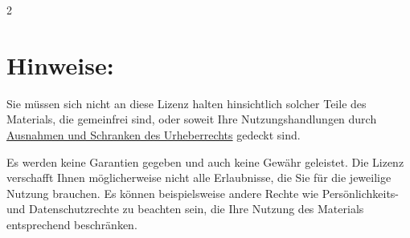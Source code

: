 \begin{multicols}{2}
\section*{Hinweise:}

Sie müssen sich nicht an diese Lizenz halten hinsichtlich solcher Teile des Materials, die gemeinfrei sind, oder soweit Ihre Nutzungshandlungen durch \href{https://creativecommons.org/licenses/by-nc-sa/4.0/deed.de\#ref-exception-or-limitation}{Ausnahmen und Schranken des Urheberrechts} gedeckt sind.

Es werden keine Garantien gegeben und auch keine Gewähr geleistet. Die Lizenz verschafft Ihnen möglicherweise nicht alle Erlaubnisse, die Sie für die jeweilige Nutzung brauchen. Es können beispielsweise andere Rechte wie Persönlichkeits- und Datenschutzrechte zu beachten sein, die Ihre Nutzung des Materials entsprechend beschränken.
\end{multicols}
